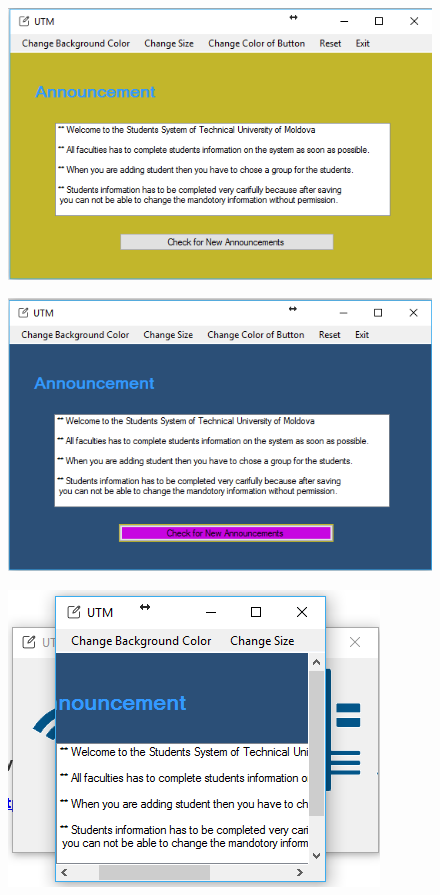 \begin{figure}
	\centering
	\includegraphics[width=0.7\linewidth]{form2-2}
	\caption{}
	\label{fig:form2-2}
\end{figure}


\begin{figure}
	\centering
	\includegraphics[width=0.7\linewidth]{form2-3}
	\caption{}
	\label{fig:form2-3}
\end{figure}


\begin{figure}
	\centering
	\includegraphics[width=0.7\linewidth]{form2-4}
	\caption{}
	\label{fig:form2-4}
\end{figure}


\clearpage